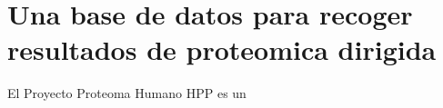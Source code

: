 %
%


\chapter*{Una base de datos para recoger resultados de proteomica dirigida}


El Proyecto Proteoma Humano \ac{HPP} es un  
